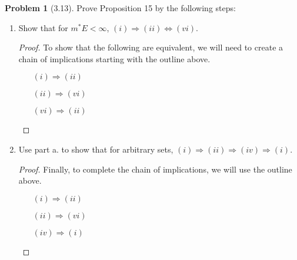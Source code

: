 \documentclass[12pt]{article}
\theoremstyle{definition}
\newtheorem{problem}{Problem}
\begin{document}
\begin{problem}[3.13]

    Prove Proposition 15 by the following steps:
        \begin{enumerate}[label = \alph{*}.]
            \item Show that for \( m^{*} E < \infty \), \( (i) \Rightarrow (ii) \Leftrightarrow (vi) \).
            \begin{proof}
                To show that the following are equivalent, we will need to create a chain of implications starting with the outline above. 

                \begin{enumerate}
                    \item[\((i) \Rightarrow (ii)\)]
                    \item[\((ii) \Rightarrow (vi)\)]
                    \item[\((vi) \Rightarrow (ii)\)]   
                \end{enumerate}
            \end{proof}
            \item Use part a. to show that for arbitrary sets, \( (i) \Rightarrow (ii) \Rightarrow (iv) \Rightarrow (i) \).
            \begin{proof}
                Finally, to complete the chain of implications, we will use the outline above. 

                \begin{enumerate}
                    \item[\((i) \Rightarrow (ii)\)]
                    \item[\((ii) \Rightarrow (vi)\)]
                    \item[\((iv) \Rightarrow (i)\)]   
                \end{enumerate}
            \end{proof}
        \end{enumerate}
    
\end{problem}
\end{document}
